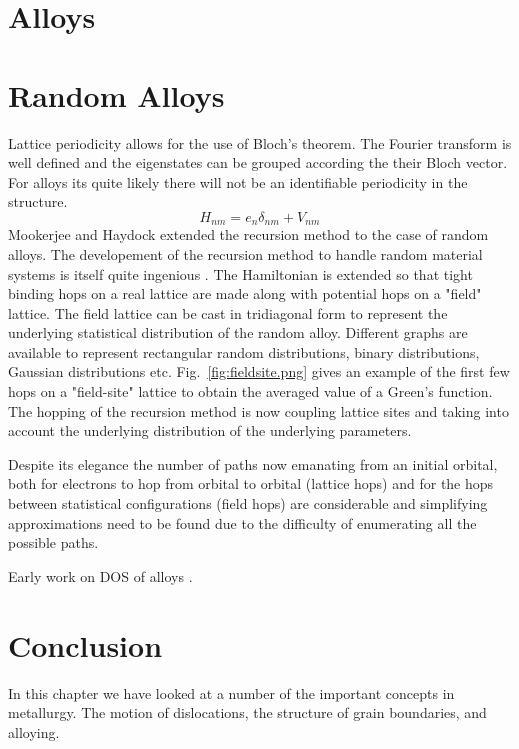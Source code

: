 \section{Alloys}
\section{Random Alloys}
Lattice periodicity allows for the use of Bloch's theorem. The Fourier transform
is well defined and the eigenstates can be grouped according the their Bloch vector.
For alloys its quite likely there will not be an identifiable periodicity in 
the structure.
%
\begin{equation}
H_{nm} = e_{n}\delta_{nm} + V_{nm}
\end{equation}
%
Mookerjee and Haydock extended the recursion method to the case of random alloys.
The developement of the recursion method to handle random material systems is 
itself quite ingenious \cite{mookerjee, haydock74}. The Hamiltonian is extended
so that tight binding hops on a real lattice are made along with potential hops
on a "field" lattice. The field lattice can be cast in tridiagonal form to represent
the underlying statistical distribution of the random alloy. Different graphs are available
to represent rectangular random distributions, binary distributions, Gaussian distributions
etc. Fig.~\ref{fig:fieldsite.png} gives an example of the first few hops on a "field-site" 
lattice to obtain the averaged value of a Green's function. The hopping of the recursion method
is now coupling lattice sites and taking into account the underlying distribution of 
the underlying parameters.

Despite its elegance the number of paths now emanating from an initial orbital, both
for electrons to hop from orbital to orbital (lattice hops) and for the hops between 
statistical configurations (field hops) are considerable and simplifying approximations 
need to be found due to the difficulty of enumerating all the possible paths.

Early work on DOS of alloys \cite{cubiotti77}. 

\section{Conclusion}
In this chapter we have looked at a number of the important concepts
in metallurgy. The motion of dislocations, 
the structure of grain boundaries, and alloying. 


